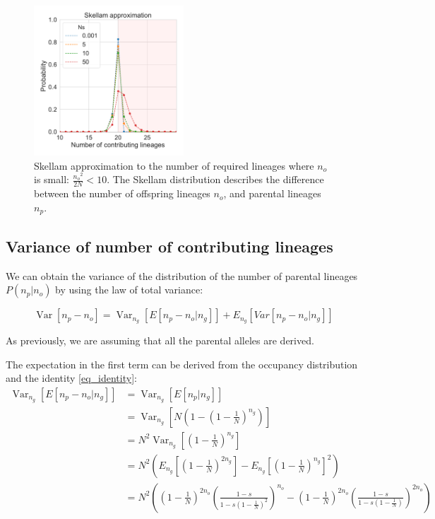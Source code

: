 \documentclass[review]{elsarticle}
\newcommand{\Var}{\operatorname{Var}}
\begin{document}
\begin{figure}
  \centering
  \includegraphics[width=0.5\textwidth]{fig/skellam.pdf}
  \caption{Skellam approximation to the number of required lineages where $n_o$ is small:
  $\frac{{n_o}^2}{2N} < 10$. The Skellam distribution describes the difference between the number
  of offspring lineages $n_o$, and parental lineages $n_p$. }
  \label{fig_apx_skellam}
\end{figure}

\subsection{Variance of number of contributing lineages}
\label{subsec_apx_variance}

We can obtain the variance of the distribution of the number of parental lineages $P(n_p | n_o)$ by using the law of total variance:

\begin{equation}
  \label{eq_apx_var}
\Var\left[n_p-n_o \right] = \Var_{n_g}\left[E\left[n_p-n_o | n_g \right]\right]+  E_{n_g}\left[Var\left[n_p-n_o | n_g \right]\right] 
\end{equation}

As previously, we are assuming that all the parental alleles are derived.

The expectation in the first term can be derived from the occupancy distribution and the identity
\ref{eq_identity}:
\begin{equation}
\begin{split}
\Var_{n_g}\left[E\left[n_p-n_o | n_g \right]\right] &= \Var_{n_g}\left[E\left[n_p| n_g \right]\right] \\
&= \Var_{n_g}\left[N\left(1-(1-\frac{1}{N})^{n_g} \right) \right] \\ 
&= N^2 \Var_{n_g}\left[(1-\frac{1}{N})^{n_g} \right] \\
&= N^2 \left( E_{n_g}\left[(1-\frac{1}{N})^{2n_g} \right] - E_{n_g}\left[(1-\frac{1}{N})^{n_g} \right]^2\right) \\
&= N^2 \left( \left(1-\frac{1}{N}\right)^{2n_o} \left(\frac{1-s}{1-s  \left(1-\frac{1}{N}\right)^2}\right)^{n_o} 
-   \left(1-\frac{1}{N}\right)^{2n_o} \left(\frac{1-s}{1-s  \left(1-\frac{1}{N}\right)}\right)^{2n_o} \right) \\
\end{split}
\end{equation}
\end{document}
